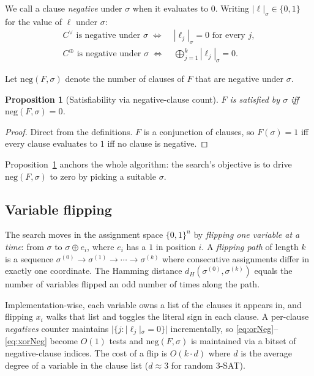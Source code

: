 \documentclass[11pt]{article}
\newtheorem{proposition}[theorem]{Proposition}
\begin{document}
We call a clause \emph{negative} under $\sigma$ when it evaluates to
$0$. Writing $|\ell|_\sigma \in \{0,1\}$ for the value of $\ell$ under
$\sigma$:
\begin{align}
C^\vee \text{ is negative under } \sigma \;\iff\;
    & |\ell_j|_\sigma = 0 \text{ for every } j,
\label{eq:orNeg}\\
C^\oplus \text{ is negative under } \sigma \;\iff\;
    & \bigoplus_{j=1}^{k} |\ell_j|_\sigma = 0.
\label{eq:xorNeg}
\end{align}

Let $\mathrm{neg}(F,\sigma)$ denote the number of clauses of $F$ that
are negative under $\sigma$.

\begin{proposition}[Satisfiability via negative-clause count]
\label{prop:satIffZero}
$F$ is satisfied by $\sigma$ iff $\mathrm{neg}(F,\sigma) = 0$.
\end{proposition}
\begin{proof}
Direct from the definitions. $F$ is a conjunction of clauses, so
$F(\sigma) = 1$ iff every clause evaluates to $1$ iff no clause is
negative.
\end{proof}

Proposition~\ref{prop:satIffZero} anchors the whole algorithm: the
search's objective is to drive $\mathrm{neg}(F,\sigma)$ to zero by
picking a suitable $\sigma$.

\subsection{Variable flipping}

The search moves in the assignment space $\{0,1\}^n$ by \emph{flipping
one variable at a time}: from $\sigma$ to $\sigma \oplus e_i$, where
$e_i$ has a $1$ in position $i$. A \emph{flipping path} of length $k$
is a sequence
$\sigma^{(0)} \to \sigma^{(1)} \to \cdots \to \sigma^{(k)}$ where
consecutive assignments differ in exactly one coordinate. The Hamming
distance $d_H(\sigma^{(0)}, \sigma^{(k)})$ equals the number of
variables flipped an odd number of times along the path.

Implementation-wise, each variable owns a list of the clauses it
appears in, and flipping $x_i$ walks that list and toggles the literal
sign in each clause. A per-clause \emph{negatives} counter maintains
$|\{j : |\ell_j|_\sigma = 0\}|$ incrementally, so
\eqref{eq:orNeg}--\eqref{eq:xorNeg} become $O(1)$ tests and
$\mathrm{neg}(F,\sigma)$ is maintained via a bitset of negative-clause
indices. The cost of a flip is $O(k \cdot d)$ where $d$ is the average
degree of a variable in the clause list ($d \approx 3$ for random 3-SAT).
\end{document}
